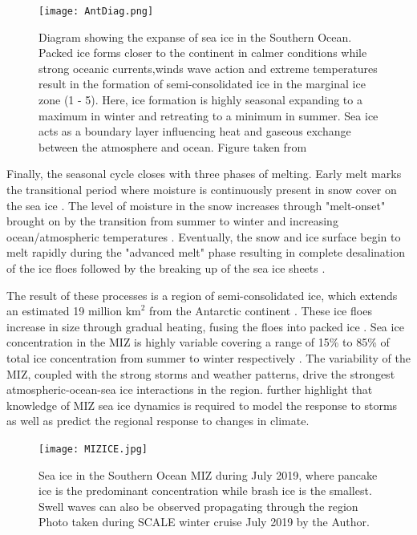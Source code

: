 \begin{figure}[H]
    \centering
    \texttt{[image: AntDiag.png]}
    \caption{Diagram showing the expanse of sea ice in the Southern Ocean. Packed ice forms closer to the continent in calmer conditions while strong oceanic currents,winds wave action and extreme temperatures result in the formation of semi-consolidated ice in the marginal ice zone (1 - 5). Here, ice formation is highly seasonal expanding to a maximum in winter and retreating to a minimum in summer. Sea ice acts as a boundary layer influencing heat and gaseous  exchange between the atmosphere and ocean. Figure taken from \textcite{Antseaice}}
    \label{fig:AntaDiag}
\end{figure}



Finally, the seasonal cycle closes with three phases of melting. Early melt marks the transitional period  where moisture is continuously present in snow cover on the sea ice \cite{barber2005microwave}. The level of moisture in the snow increases through "melt-onset" brought on by the transition from summer to winter and increasing ocean/atmospheric temperatures \cite{barber2005microwave}. Eventually, the snow and ice surface begin to melt rapidly during the "advanced melt" phase resulting in complete desalination of the ice floes followed by the breaking up of the sea ice sheets \cite{barber2005microwave}. 

The result of these processes is a region of semi-consolidated ice, which extends an estimated 19 million $\text{km}^2$ from the Antarctic continent \cite{MAKSYM2012seaiceextent}. These ice floes increase in size through gradual heating, fusing the floes into packed ice \cite{arrigo2004large}. Sea ice concentration in the MIZ is highly variable covering a range of 15\% to 85\% of total ice concentration from summer to winter respectively \cite{alberello2019drift}. The variability of the MIZ, coupled with the strong storms and weather patterns, drive the strongest atmospheric-ocean-sea ice interactions in the region. \textcite{alberello2019drift} further highlight that knowledge of MIZ sea ice dynamics is required to model the response to storms as well as predict the regional response to changes in climate.

\begin{figure}[H]
    \centering
   \texttt{[image: MIZICE.jpg]}
    \caption{Sea ice in the Southern Ocean MIZ during July 2019, where pancake ice is the predominant  concentration while brash ice is the smallest. Swell waves can also be observed propagating through the region Photo taken during SCALE winter cruise July 2019 by the Author.}
    \label{fig:MIZICE}
\end{figure}

